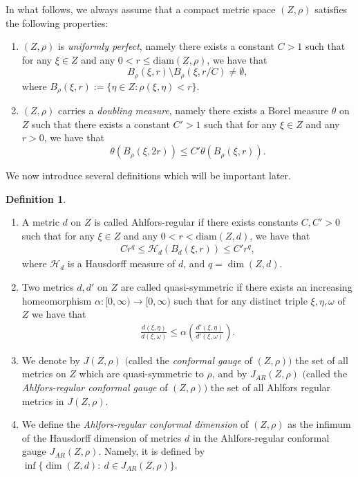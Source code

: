 \documentclass[10pt]{amsart}
\theoremstyle{definition}\newtheorem{defi}[theo]{Definition}\newtheorem{rema}[theo]{Remark}\newtheorem{exam}[theo]{Example}\newtheorem{exem}[theo]{Example}\newtheorem{nota}[theo]{Notation}
\newcommand{\ch}{\mathcal{H}}
\newcommand{\diam}{\mathrm{diam}}
\newcommand*{\romanenumi}{\renewcommand*{\theenumi}{\roman{enumi}}}
\begin{document}
In what follows, we always assume that a compact metric space $(Z,\rho)$ satisfies the following properties:
\begin{enumerate}\romanenumi
\item $(Z,\rho)$ is \emph{uniformly perfect}, namely there exists a constant $C>1$ such that for any $\xi\in Z$ and any $0<r\leq\diam(Z,\rho)$, we have that
\[
B_{\rho}(\xi,r)\setminus B_{\rho}(\xi,r/C)\neq\emptyset,
\]
where $B_{\rho}(\xi,r):=\{\eta\in Z:\rho(\xi,\eta)<r\}$.
\item $(Z,\rho)$ carries a \emph{doubling measure}, namely there exists a Borel measure $\theta$ on $Z$ such that there exists a constant $C'>1$ such that for any $\xi\in Z$ and any $r>0$, we have that
\[
\theta(B_{\rho}(\xi,2r))\leq C'\theta(B_{\rho}(\xi,r)).
\]
\end{enumerate}
We now introduce several definitions which will be important later.
\begin{defi}\label{def:arcd}\leavevmode
\begin{enumerate}
\item\label{defi4.2.1} A metric $d$ on $Z$ is called Ahlfors-regular if there exists constants $C,C'>0$ such that for any $\xi\in Z$ and any $0<r<\diam(Z,d)$, we have that
\begin{align*}
Cr^q \leq\ch_{d}(B_{d}(\xi,r))\leq C'r^q,
\end{align*}
where $\ch_{d}$ is a Hausdorff measure of $d$, and $q=\dim(Z,d)$.
\item\label{defi4.2.2} Two metrics $d,d'$ on $Z$ are called quasi-symmetric if there exists an increasing homeomorphism $\alpha:[0,\infty)\to[0,\infty)$ such that for any distinct triple $\xi,\eta,\omega$ of $Z$ we have that
\begin{align*}
\frac{d(\xi,\eta)}{d(\xi,\omega)}\leq\alpha\left(\frac{d'(\xi,\eta)}{d'(\xi,\omega)}\right).
\end{align*}
\item\label{defi4.2.3} We denote by $J(Z,\rho)$ $($called the \emph{conformal gauge} of $(Z,\rho))$ the set of all metrics on $Z$ which are quasi-symmetric to $\rho$, and by $J_{AR}(Z,\rho)$ $($called the \emph{Ahlfors-regular conformal gauge} of $(Z,\rho))$ the set of all Ahlfors regular metrics in $J(Z,\rho)$.
\item\label{defi4.2.4} We define the \emph{Ahlfors-regular conformal dimension} of $(Z,\rho)$ as the infimum of the Hausdorff dimension of metrics $d$ in the Ahlfors-regular conformal gauge $J_{AR}(Z,\rho)$. Namely, it is defined by $\inf\{\dim(Z,d):\ d\in J_{AR}(Z,\rho)\}$.
\end{enumerate}
\end{defi}
\end{document}
